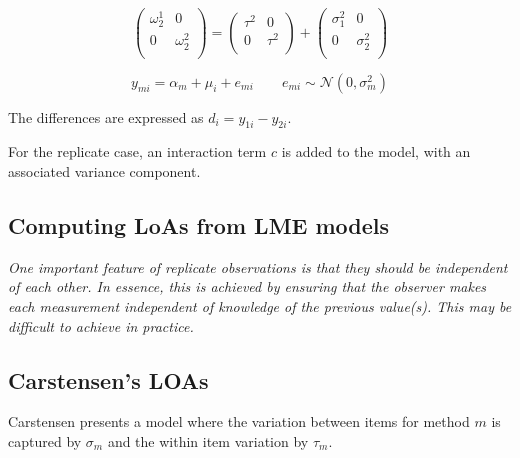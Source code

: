 \documentclass{report}
\begin{document}
\[\left(\begin{array}{cc}
\omega^1_2  & 0 \\
0 & \omega^2_2 \\
\end{array}  \right)
=  \left(
\begin{array}{cc}
\tau^2  & 0 \\
0 & \tau^2 \\
\end{array} \right)+
\left(
\begin{array}{cc}
\sigma^2_1  & 0 \\
0 & \sigma^2_2 \\
\end{array}\right)
\]









%

\begin{equation}
	y_{mi}  = \alpha_{m} + \mu_{i} + e_{mi} \qquad  e_{mi} \sim \mathcal{N}(0,\sigma^{2}_{m})
\end{equation}

The differences are expressed as $d_{i} = y_{1i} - y_{2i}$.

For the replicate case, an interaction term $c$ is added to the model, with an associated variance component.

\subsection{Computing LoAs from LME models}


%
\emph{
	One important feature of replicate observations is that they should be independent
	of each other. In essence, this is achieved by ensuring that the observer makes each
	measurement independent of knowledge of the previous value(s). This may be difficult
	to achieve in practice.}


\subsection{Carstensen's LOAs}
%
Carstensen presents a model where the variation between items for
method $m$ is captured by $\sigma_m$ and the within item variation
by $\tau_m$.
\end{document}
